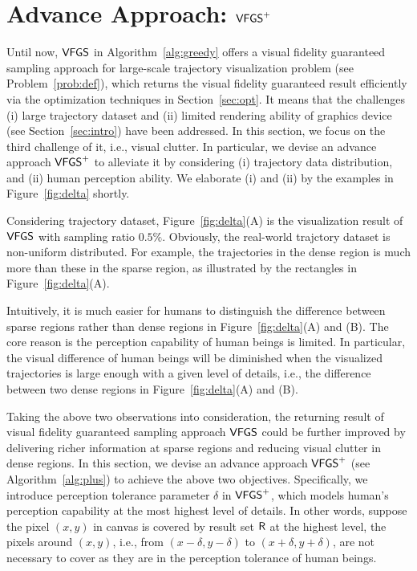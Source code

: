 \section{Advance Approach: $\mathsf{VFGS}^{+}$}\label{sec:aa}
Until now, $\mathsf{VFGS}$ in Algorithm~\ref{alg:greedy} offers a visual fidelity guaranteed sampling approach for large-scale trajectory visualization problem (see Problem~\ref{prob:def}),
which returns the visual fidelity guaranteed result efficiently via the optimization techniques in Section~\ref{sec:opt}.
It means that the challenges (i) large trajectory dataset and (ii) limited rendering ability of graphics device (see Section~\ref{sec:intro}) have been addressed.
In this section, we focus on the third challenge of it, i.e.,  visual clutter.
In particular, we devise an advance approach $\mathsf{VFGS}^{+}$ to alleviate it by considering
(i) trajectory data distribution, and (ii) human perception ability.
We elaborate (i) and (ii) by the examples in Figure~\ref{fig:delta} shortly.

 Considering \pt{} trajectory dataset, Figure~\ref{fig:delta}(A) is the visualization result of $\mathsf{VFGS}$ with sampling ratio $0.5\%$.
Obviously, the real-world trajctory dataset is non-uniform distributed.
For example, the trajectories in the dense region is much more than these in the sparse region, as illustrated by the rectangles in Figure~\ref{fig:delta}(A).

 Intuitively, it is much easier for humans to distinguish the difference between sparse regions rather than dense regions in Figure~\ref{fig:delta}(A) and (B).
The core reason is the perception capability of human beings is limited.
In particular, the visual difference of human beings will be diminished when the visualized trajectories is large enough with a given level of details,
i.e., the difference between two dense regions in Figure~\ref{fig:delta}(A) and (B).

Taking the above two observations into consideration, the returning result of visual fidelity guaranteed sampling approach $\mathsf{VFGS}$ could be further improved by
delivering richer information at sparse regions and reducing visual clutter in dense regions.
In this section, we devise an advance approach $\mathsf{VFGS}^{+}$ (see Algorithm~\ref{alg:plus}) to achieve the above two objectives.
Specifically, we introduce perception tolerance parameter $\delta$ in $\mathsf{VFGS}^{+}$, which models human's perception capability at the most highest level of details.
In other words, suppose the pixel $(x,y)$ in canvas is covered by result set $\mathsf{R}$ at the highest level,
the pixels around $(x,y)$, i.e., from $(x-\delta, y-\delta)$ to $(x+\delta, y+\delta)$, are not necessary to cover as they are in the perception tolerance of human beings.


